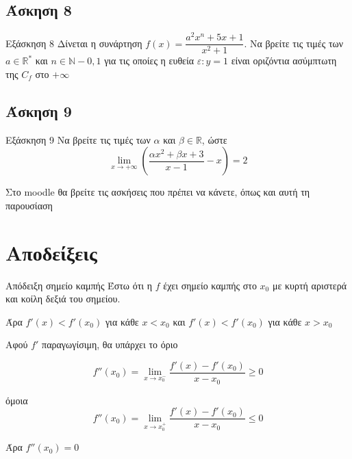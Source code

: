 \documentclass[greek]{beamer}
\begin{document}
\subsection{Άσκηση 8}
\begin{frame}[label=Άσκηση8,t]{Εξάσκηση 8}
 Δίνεται η συνάρτηση $f(x)=\dfrac{a^2x^n+5x+1}{x^2+1}$. Να βρείτε τις τιμές των $a\in\mathbb{R}^*$ και $n\in\mathbb{N}-{0,1}$ για τις οποίες η ευθεία $ε:y=1$ είναι οριζόντια ασύμπτωτη της $C_f$ στο $+\infty$

\end{frame}

\subsection{Άσκηση 9}
\begin{frame}[label=Άσκηση9,t]{Εξάσκηση 9}
 Να βρείτε τις τιμές των $α$ και $β\in\mathbb{R}$, ώστε
 $$\lim\limits_{x \to +\infty}{ \left(   \dfrac{αx^2+βx+3}{x-1}-x \right)}=2$$

\end{frame}

\begin{frame}
 Στο moodle θα βρείτε τις ασκήσεις που πρέπει να κάνετε, όπως και αυτή τη παρουσίαση
\end{frame}


\appendix

\section{Αποδείξεις}
\begin{frame}[label=Απόδειξη1]{Απόδειξη σημείο καμπής}
  Έστω ότι η $f$ έχει σημείο καμπής στο $x_0$ με κυρτή αριστερά και κοίλη δεξιά του σημείου.

 Άρα $f'(x)< f'(x_0)$ για κάθε $x<x_0$ και $f'(x)<f'(x_0)$ για κάθε $x>x_0$

  Αφού $f'$ παραγωγίσιμη, θα υπάρχει το όριο

 $$f''(x_0)=\lim\limits_{x \to x_0^-}{ \dfrac{f'(x)-f'(x_0)}{x-x_0} }\ge 0$$

  όμοια
 $$f''(x_0)=\lim\limits_{x \to x_0^+}{ \dfrac{f'(x)-f'(x_0)}{x-x_0} } \le 0$$

  Άρα $f''(x_0)=0$ \hyperlink{Θεώρημα1}{}
\end{frame}
\end{document}
